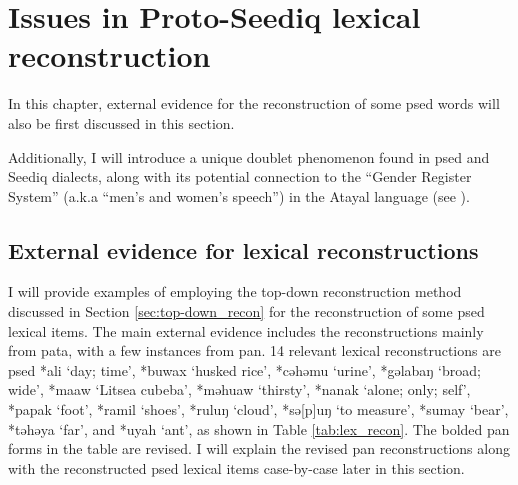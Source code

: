 \chapter{Issues in Proto-Seediq lexical reconstruction} \label{ch6}

In this chapter, external evidence for the reconstruction of some \acl{psed} words will also be first discussed in this section.

Additionally, I will introduce a unique doublet phenomenon found in \acl{psed} and Seediq dialects, along with its potential connection to the ``Gender Register System'' (a.k.a ``men's and women's speech'') in the Atayal language (see \cite{li1980gender,li1982gender,li1983gender,goderich2020phd}). 


\section{External evidence for lexical reconstructions} \label{sec:external_lexical_evidence}

I will provide examples of employing the top-down reconstruction method discussed in Section \ref{sec:top-down_recon} for the reconstruction of some \acl{psed} lexical items. The main external evidence includes the reconstructions mainly from \acl{pata}, with a few instances from \acl{pan}. 14 relevant lexical reconstructions are \acl{psed} *ali `day; time', *buwax `husked rice', *cəhəmu `urine', *gəlabaŋ `broad; wide', *maaw `Litsea cubeba', *məhuaw `thirsty', *nanak `alone; only; self', *papak `foot', *ramil `shoes', *ruluŋ `cloud', *sə[p]uŋ `to measure', *sumay `bear', *təhəya `far', and *uyah `ant', as shown in Table \ref{tab:lex_recon}. The bolded \acs{pan} forms in the table are revised. I will explain the revised \acs{pan} reconstructions along with the reconstructed \acl{psed} lexical items case-by-case later in this section.

